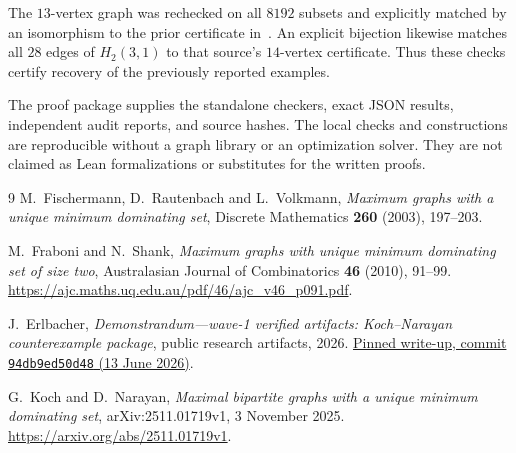 \documentclass[11pt]{article}
\theoremstyle{definition}
\theoremstyle{remark}
\begin{document}
The $13$-vertex graph was rechecked on all $8192$ subsets and explicitly
matched by an isomorphism to the prior certificate in~\cite{E}.
An explicit bijection likewise matches all $28$ edges of $H_2(3,1)$ to
that source's $14$-vertex certificate. Thus these checks certify recovery
of the previously reported examples.

The proof package supplies the standalone checkers, exact JSON results,
independent audit reports, and source hashes. The local checks and
constructions are reproducible without a graph library or an optimization
solver. They are not claimed as Lean formalizations or substitutes for
the written proofs.

\begin{thebibliography}{9}
M.~Fischermann, D.~Rautenbach and L.~Volkmann,
\emph{Maximum graphs with a unique minimum dominating set},
Discrete Mathematics \textbf{260} (2003), 197--203.

M.~Fraboni and N.~Shank,
\emph{Maximum graphs with unique minimum dominating set of size two},
Australasian Journal of Combinatorics \textbf{46} (2010), 91--99.
\url{https://ajc.maths.uq.edu.au/pdf/46/ajc_v46_p091.pdf}.

J.~Erlbacher,
\emph{Demonstrandum---wave-1 verified artifacts: Koch--Narayan counterexample package},
public research artifacts, 2026.
\href{https://github.com/demonstrandum-research/artifacts/blob/94db9ed50d48a57aae5ccb72e6a95a2b8f8f39d3/problems/p2-factory/kills/koch-narayan/WRITEUP.md}{Pinned write-up, commit \texttt{94db9ed50d48} (13 June 2026)}.

G.~Koch and D.~Narayan,
\emph{Maximal bipartite graphs with a unique minimum dominating set},
arXiv:2511.01719v1, 3 November 2025.
\url{https://arxiv.org/abs/2511.01719v1}.
\end{thebibliography}
\end{document}
